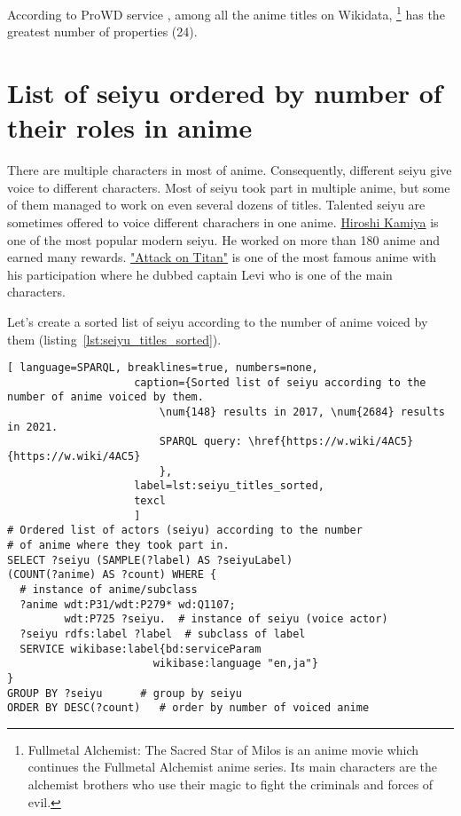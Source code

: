 According to ProWD service \autocite{anime_prowd}, among all the anime titles on Wikidata, \footnote{Fullmetal Alchemist: The Sacred Star of Milos is an anime movie which continues the Fullmetal Alchemist anime series. Its main characters are the alchemist brothers who use their magic to fight the criminals and forces of evil.} has the greatest number of properties (\num{24}).

\section{List of seiyu ordered by number of their roles in anime}

There are multiple characters in most of anime. Consequently, different seiyu give voice to different characters. Most of seiyu took part in multiple anime, but some of them managed to work on even several dozens of titles. Talented seiyu are sometimes offered to voice different charachers in one anime. \href{https://w.wiki/4UFa}{Hiroshi Kamiya} is one of the most popular modern seiyu. He worked on more than 180 anime and earned many rewards. \href{https://w.wiki/4UFh}{"Attack on Titan"} is one of the most famous anime with his participation where he dubbed captain Levi who is one of the main characters.

Let's create a sorted list of seiyu according to the number of anime voiced by them (listing~\ref{lst:seiyu_titles_sorted}).

\begin{lstlisting}[ language=SPARQL, breaklines=true, numbers=none,
                    caption={Sorted list of seiyu according to the number of anime voiced by them.
                        \num{148} results in 2017, \num{2684} results in 2021.
                        SPARQL query: \href{https://w.wiki/4AC5}{https://w.wiki/4AC5}
                        },
                    label=lst:seiyu_titles_sorted,
                    texcl 
                    ]
# Ordered list of actors (seiyu) according to the number
# of anime where they took part in.
SELECT ?seiyu (SAMPLE(?label) AS ?seiyuLabel)
(COUNT(?anime) AS ?count) WHERE {
  # instance of anime/subclass
  ?anime wdt:P31/wdt:P279* wd:Q1107;
         wdt:P725 ?seiyu.  # instance of seiyu (voice actor)
  ?seiyu rdfs:label ?label	# subclass of label
  SERVICE wikibase:label{bd:serviceParam
					   wikibase:language "en,ja"}
}
GROUP BY ?seiyu		 # group by seiyu 
ORDER BY DESC(?count)	# order by number of voiced anime
\end{lstlisting}%

